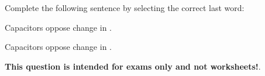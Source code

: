 

Complete the following sentence by selecting the correct last word:

\vskip 10pt {\narrower \noindent \baselineskip5pt

Capacitors oppose change in .

\par} \vskip 10pt








Capacitors oppose change in .







{\bf This question is intended for exams only and not worksheets!}.



